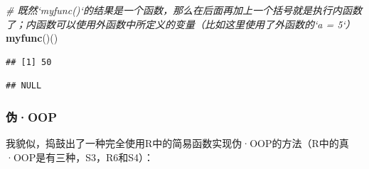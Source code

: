 \documentclass[]{book}
\newenvironment{Shaded}{\begin{snugshade}}{\end{snugshade}}
\newcommand{\CommentTok}[1]{\textcolor[rgb]{0.56,0.35,0.01}{\textit{#1}}}
\newcommand{\ControlFlowTok}[1]{\textcolor[rgb]{0.13,0.29,0.53}{\textbf{#1}}}
\newcommand{\KeywordTok}[1]{\textcolor[rgb]{0.13,0.29,0.53}{\textbf{#1}}}
\newcommand{\NormalTok}[1]{#1}
\newcommand{\OperatorTok}[1]{\textcolor[rgb]{0.81,0.36,0.00}{\textbf{#1}}}
\newcommand{\StringTok}[1]{\textcolor[rgb]{0.31,0.60,0.02}{#1}}
\begin{document}
\begin{Shaded}
\begin{Highlighting}[]
\CommentTok{# 既然`myfunc()`的结果是一个函数，那么在后面再加上一个括号就是执行内函数了；内函数可以使用外函数中所定义的变量（比如这里使用了外函数的`a = 5`）}
\KeywordTok{myfunc}\NormalTok{()()}
\end{Highlighting}
\end{Shaded}

\begin{verbatim}
## [1] 50
\end{verbatim}

\begin{Shaded}
\end{Shaded}

\begin{verbatim}
## NULL
\end{verbatim}

\hypertarget{fake-OOP}{%
\subsubsection{伪·OOP}\label{fake-OOP}}

我貌似，捣鼓出了一种完全使用R中的简易函数实现伪·OOP的方法（R中的真·OOP是有三种，S3，R6和S4）：
\end{document}
